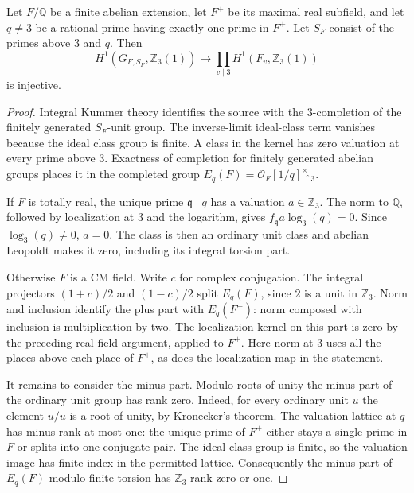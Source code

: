 \begin{lemma}
\label{lem:root-real-q-units}
Let $F/\mathbb Q$ be a finite abelian extension, let $F^+$ be its maximal
real subfield, and let $q\ne3$ be a rational prime having exactly one prime
in $F^+$.  Let $S_F$ consist of the primes above $3$ and $q$.  Then
\[
 H^1(G_{F,S_F},\mathbb Z_3(1))
 \longrightarrow\prod_{v\mid3}H^1(F_v,\mathbb Z_3(1))
\]
is injective.
\end{lemma}
\begin{proof}
Integral Kummer theory identifies the source with the $3$-completion
of the finitely generated $S_F$-unit group.  The inverse-limit ideal-class
term vanishes because the ideal class group is finite.  A class in the
kernel has zero valuation at every prime above $3$.  Exactness of
completion for finitely generated abelian groups places it in the
completed group $E_q(F)=\mathcal O_F[1/q]^\times\widehat{\ }_3$.

If $F$ is totally real, the unique prime $\mathfrak q\mid q$ has a
valuation $a\in\mathbb Z_3$.  The norm to $\mathbb Q$, followed by
localization at $3$ and the logarithm, gives
$f_{\mathfrak q}a\log_3(q)=0$.  Since $\log_3(q)\ne0$, $a=0$.
The class is then an ordinary unit class and abelian Leopoldt makes it
zero, including its integral torsion part.

Otherwise $F$ is a CM field.  Write $c$ for complex conjugation.
The integral projectors $(1+c)/2$ and $(1-c)/2$ split $E_q(F)$, since
$2$ is a unit in $\mathbb Z_3$.  Norm and inclusion identify the plus
part with $E_q(F^+)$: norm composed with inclusion is multiplication by two.
The localization kernel on this part is zero by the preceding real-field
argument, applied to $F^+$.  Here norm at $3$ uses all the places above
each place of $F^+$, as does the localization map in the statement.

It remains to consider the minus part.  Modulo roots of unity the minus
part of the ordinary unit group has rank zero.  Indeed, for every
ordinary unit $u$ the element $u/\bar u$ is a root of unity, by
Kronecker's theorem.  The valuation lattice at $q$ has minus rank at
most one: the unique prime of $F^+$ either stays a single prime in $F$
or splits into one conjugate pair.  The ideal class group is finite,
so the valuation image has finite index in the permitted lattice.
Consequently the minus part of $E_q(F)$ modulo finite torsion has
$\mathbb Z_3$-rank zero or one.


\end{proof}
